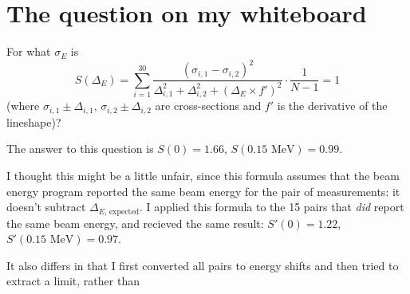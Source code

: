 \documentclass[12pt]{article}
\begin{document}
\section*{The question on my whiteboard}

For what $\sigma_E$ is
\begin{equation}
  S(\Delta_E) = \sum_{i=1}^{30} \frac{(\sigma_{i,1} - \sigma_{i,2})^2}{\Delta_{i,1}^2 + \Delta_{i,2}^2 + (\Delta_E \times f')^2} \cdot \frac{1}{N-1} = 1
\end{equation}
(where $\sigma_{i,1} \pm \Delta_{i,1}$, $\sigma_{i,2} \pm
\Delta_{i,2}$ are cross-sections and $f'$ is the derivative of the
lineshape)?

The answer to this question is $S(0) = 1.66$, $S(0.15\mbox{ MeV}) = 0.99$.

I thought this might be a little unfair, since this formula assumes
that the beam energy program reported the same beam energy for the
pair of measurements: it doesn't subtract $\Delta_{E\mbox{,
expected}}$.  I applied this formula to the 15 pairs that {\it did}
report the same beam energy, and recieved the same result: $S'(0) =
1.22$, $S'(0.15\mbox{ MeV}) = 0.97$.

It also differs in that I first converted all pairs to energy shifts
and then tried to extract a limit, rather than 
\end{document}
